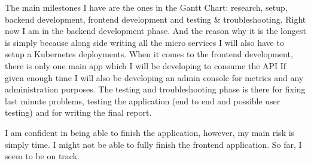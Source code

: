 \documentclass[11pt]{article}
\begin{document}
The main milestones I have are the ones in the Gantt Chart: research, setup, backend development, frontend development and testing \& troubleshooting. Right now I am in the backend development phase. And the reason why it is the longest is simply because along side writing all the micro services I will also have to setup a Kubernetes deployments. When it comes to the frontend development, there is only one main app which I will be developing to consume the API If given enough time I will also be developing an admin console for metrics and any administration purposes. The testing and troubleshooting phase is there for fixing last minute problems, testing the application (end to end and possible user testing) and for writing the final report. \par

I am confident in being able to finish the application, however, my main risk is simply time. I might not be able to fully finish the frontend application. So far, I seem to be on track.\par
\end{document}
